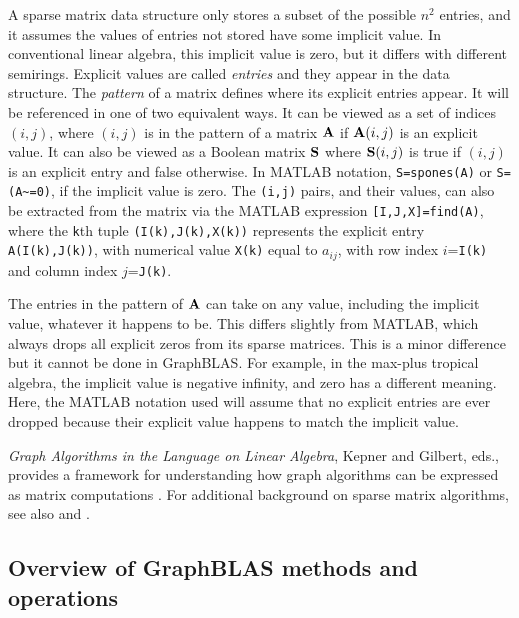\documentclass[12pt]{article}
\begin{document}
A sparse matrix data structure only stores a subset of the possible $n^2$
entries, and it assumes the values of entries not stored have some implicit
value.  In conventional linear algebra, this implicit value is zero, but it
differs with different semirings.  Explicit values are called {\em entries} and
they appear in the data structure.  The {\em pattern} of a matrix  defines
where its explicit entries appear.  It will be referenced in one of two
equivalent ways.  It can be viewed as a set of indices $(i,j)$, where $(i,j)$
is in the pattern of a matrix ${\bf A}$ if ${\bf A}(i,j)$ is an explicit value.
It can also be viewed as a Boolean matrix ${\bf S}$ where ${\bf S}(i,j)$ is
true if $(i,j)$ is an explicit entry and false otherwise.  In MATLAB notation,
\verb'S=spones(A)' or \verb'S=(A~=0)', if the implicit value is zero.  The
\verb'(i,j)' pairs, and their values, can also be extracted from the matrix via
the MATLAB expression \verb'[I,J,X]=find(A)', where the \verb'k'th tuple
\verb'(I(k),J(k),X(k))' represents the explicit entry \verb'A(I(k),J(k))', with
numerical value \verb'X(k)' equal to $a_{ij}$, with row index $i$=\verb'I(k)'
and column index $j$=\verb'J(k)'.

The entries in the pattern of ${\bf A}$ can take on any value, including the
implicit value, whatever it happens to be.  This differs slightly from MATLAB,
which always drops all explicit zeros from its sparse matrices.  This is a
minor difference but it cannot be done in GraphBLAS.  For example, in the
max-plus tropical algebra, the implicit value is negative infinity, and zero
has a different meaning.  Here, the MATLAB notation used will assume that no
explicit entries are ever dropped because their explicit value happens to match
the implicit value.

{\em Graph Algorithms in the Language on Linear Algebra}, Kepner and Gilbert,
eds., provides a framework for understanding how graph algorithms can be
expressed as matrix computations \cite{KepnerGilbert2011}.  For additional
background on sparse matrix algorithms, see also \cite{Davis06book} and
\cite{DavisRajamanickamSidLakhdar16}.

\subsection{Overview of GraphBLAS methods and operations} %
\label{overview}
\end{document}
